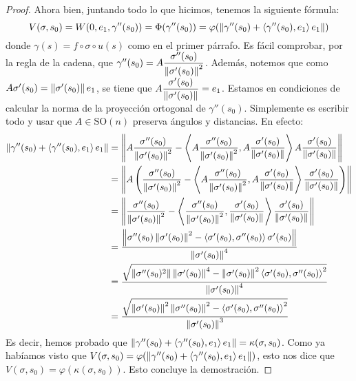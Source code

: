 \begin{prop}
\begin{proof}
Ahora bien, juntando todo lo que hicimos, tenemos la siguiente fórmula: $$V(\sigma,s_0)=W(0,e_1,\gamma''(s_0))=\Phi(\gamma''(s_0))=\varphi(\left\| \gamma''(s_0)+\left\langle \gamma''(s_0),e_1 \right\rangle e_1 \right\|)$$ donde $\gamma(s)=f\circ\sigma\circ u(s)$ como en el primer párrafo. Es fácil comprobar, por la regla de la cadena, que $\gamma''(s_0)=A\dfrac{\sigma''(s_0)}{\left\| \sigma'(s_0) \right\|^2}$. Además, notemos que como $A\sigma'(s_0) = \left\| \sigma'(s_0) \right\|e_1$, se tiene que $A\dfrac{\sigma'(s_0)}{\left\| \sigma'(s_0) \right\|} = e_1$. Estamos en condiciones de calcular la norma de la proyección ortogonal de $\gamma''(s_0)$. Simplemente es escribir todo y usar que $A\in\mathrm{SO}(n)$ preserva ángulos y distancias. En efecto: \begin{align*}\left\| \gamma''(s_0)+\left\langle \gamma''(s_0),e_1 \right\rangle e_1 \right\| &= \left\| A\dfrac{\sigma''(s_0)}{\left\| \sigma'(s_0) \right\|^2} - \left\langle A\dfrac{\sigma''(s_0)}{\left\| \sigma'(s_0) \right\|^2},A\dfrac{\sigma'(s_0)}{\left\| \sigma'(s_0) \right\|} \right\rangle A\dfrac{\sigma'(s_0)}{\left\| \sigma'(s_0) \right\|} \right\| \\ &= \left\| A\left(\dfrac{\sigma''(s_0)}{\left\| \sigma'(s_0) \right\|^2} - \left\langle A\dfrac{\sigma''(s_0)}{\left\| \sigma'(s_0) \right\|^2},A\dfrac{\sigma'(s_0)}{\left\| \sigma'(s_0) \right\|} \right\rangle\dfrac{\sigma'(s_0)}{\left\| \sigma'(s_0) \right\|}\right) \right\|\\&= \left\| \dfrac{\sigma''(s_0)}{\left\| \sigma'(s_0) \right\|^2} - \left\langle \dfrac{\sigma''(s_0)}{\left\| \sigma'(s_0) \right\|^2},\dfrac{\sigma'(s_0)}{\left\| \sigma'(s_0) \right\|} \right\rangle\dfrac{\sigma'(s_0)}{\left\| \sigma'(s_0) \right\|} \right\| \\ &= \dfrac{\left\| \sigma''(s_0)\left\| \sigma'(s_0) \right\|^2 - \left\langle \sigma'(s_0),\sigma''(s_0) \right\rangle\sigma'(s_0) \right\|}{\left\| \sigma'(s_0) \right\|^4}\\&=\dfrac{\sqrt{\left\| \sigma''(s_0)^2 \right\|\left\| \sigma'(s_0) \right\|^4 -\left\| \sigma'(s_0) \right\|^2\left\langle \sigma'(s_0),\sigma''(s_0) \right\rangle^2}}{\left\| \sigma'(s_0) \right\|^4} \\ &= \dfrac{\sqrt{\left\| \sigma'(s_0) \right\|^2\left\| \sigma''(s_0) \right\|^2 - \left\langle \sigma'(s_0),\sigma''(s_0) \right\rangle^2}}{\left\| \sigma'(s_0) \right\|^3}\end{align*}Es decir, hemos probado que $\left\| \gamma''(s_0)+\left\langle \gamma''(s_0),e_1 \right\rangle e_1 \right\| = \kappa(\sigma,s_0)$. Como ya habíamos visto que $V(\sigma,s_0)=\varphi(\left\| \gamma''(s_0)+\left\langle \gamma''(s_0),e_1 \right\rangle e_1 \right\|)$, esto nos dice que $V(\sigma,s_0)=\varphi(\kappa(\sigma,s_0))$. Esto concluye la demostración.
\end{proof}
\end{prop}

